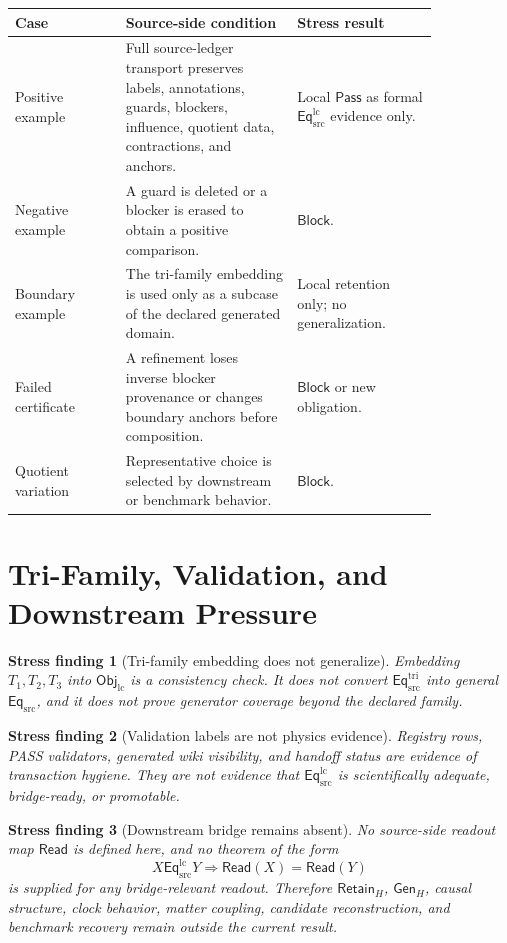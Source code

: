 \documentclass[11pt]{article}
\newcommand{\EqSrc}{\mathsf{Eq}_{\mathrm{src}}}
\newcommand{\EqTri}{\mathsf{Eq}_{\mathrm{src}}^{\mathrm{tri}}}
\newcommand{\EqLC}{\mathsf{Eq}_{\mathrm{src}}^{\mathrm{lc}}}
\newcommand{\ObjLC}{\mathsf{Obj}_{\mathrm{lc}}}
\newcommand{\Read}{\mathsf{Read}}
\newcommand{\RetainH}{\mathsf{Retain}_{H}}
\newcommand{\GenH}{\mathsf{Gen}_{H}}
\newcommand{\Pass}{\mathsf{Pass}}
\newcommand{\Block}{\mathsf{Block}}
\newtheorem{stressfinding}{Stress finding}
\begin{document}
\begin{center}
\begin{tabular}{>{\raggedright\arraybackslash}p{0.22\linewidth} >{\raggedright\arraybackslash}p{0.34\linewidth} >{\raggedright\arraybackslash}p{0.28\linewidth}}
\textbf{Case} & \textbf{Source-side condition} & \textbf{Stress result} \\
\hline
Positive example & Full source-ledger transport preserves labels, annotations, guards, blockers, influence, quotient data, contractions, and anchors. & Local \(\Pass\) as formal \(\EqLC\) evidence only. \\
Negative example & A guard is deleted or a blocker is erased to obtain a positive comparison. & \(\Block\). \\
Boundary example & The tri-family embedding is used only as a subcase of the declared generated domain. & Local retention only; no generalization. \\
Failed certificate & A refinement loses inverse blocker provenance or changes boundary anchors before composition. & \(\Block\) or new obligation. \\
Quotient variation & Representative choice is selected by downstream or benchmark behavior. & \(\Block\). \\
\end{tabular}
\end{center}

\section{Tri-Family, Validation, and Downstream Pressure}

\begin{stressfinding}[Tri-family embedding does not generalize]
Embedding \(T_{1},T_{2},T_{3}\) into \(\ObjLC\) is a consistency check.
It does not convert \(\EqTri\) into general \(\EqSrc\), and it does not
prove generator coverage beyond the declared family.
\end{stressfinding}

\begin{stressfinding}[Validation labels are not physics evidence]
Registry rows, PASS validators, generated wiki visibility, and handoff
status are evidence of transaction hygiene. They are not evidence that
\(\EqLC\) is scientifically adequate, bridge-ready, or promotable.
\end{stressfinding}

\begin{stressfinding}[Downstream bridge remains absent]
No source-side readout map \(\Read\) is defined here, and no theorem of
the form
\[
    X\EqLC Y \Longrightarrow \Read(X)=\Read(Y)
\]
is supplied for any bridge-relevant readout. Therefore \(\RetainH\),
\(\GenH\), causal structure, clock behavior, matter coupling, candidate
reconstruction, and benchmark recovery remain outside the current
result.
\end{stressfinding}
\end{document}
